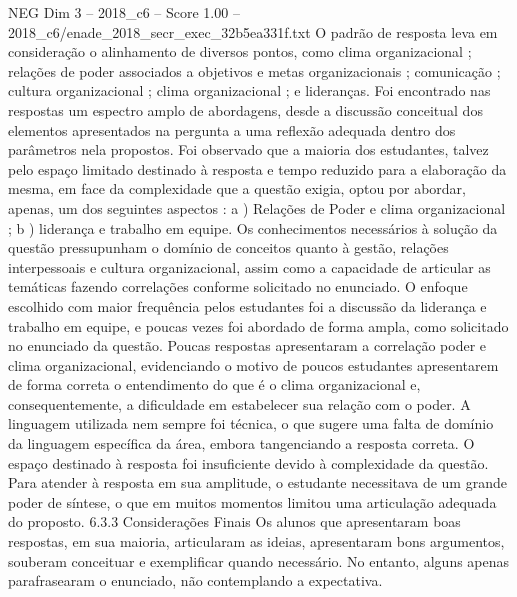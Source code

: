 \begin{textsample}{NEG Dim 3 – 2018\_c6 – Score 1.00 – 2018\_c6/enade\_2018\_secr\_exec\_32b5ea331f.txt}
O padrão de resposta leva em consideração o alinhamento de diversos pontos, como clima organizacional ; relações de poder associados a objetivos e metas organizacionais ; comunicação ; cultura organizacional ; clima organizacional ; e lideranças.
Foi encontrado nas respostas um espectro amplo de abordagens, desde a discussão conceitual dos elementos apresentados na pergunta a uma reflexão adequada dentro dos parâmetros nela propostos.
Foi observado que a maioria dos estudantes, talvez pelo espaço limitado destinado à resposta e tempo reduzido para a elaboração da mesma, em face da complexidade que a questão exigia, optou por abordar, apenas, um dos seguintes aspectos : a ) Relações de Poder e clima organizacional ; b ) liderança e trabalho em equipe.
Os conhecimentos necessários à solução da questão pressupunham o domínio de conceitos quanto à gestão, relações interpessoais e cultura organizacional, assim como a capacidade de articular as temáticas fazendo correlações conforme solicitado no enunciado.
O enfoque escolhido com maior frequência pelos estudantes foi a discussão da liderança e trabalho em equipe, e poucas vezes foi abordado de forma ampla, como solicitado no enunciado da questão.
Poucas respostas apresentaram a correlação poder e clima organizacional, evidenciando o motivo de poucos estudantes apresentarem de forma correta o entendimento do que é o clima organizacional e, consequentemente, a dificuldade em estabelecer sua relação com o poder.
A linguagem utilizada nem sempre foi técnica, o que sugere uma falta de domínio da linguagem específica da área, embora tangenciando a resposta correta.
O espaço destinado à resposta foi insuficiente devido à complexidade da questão.
Para atender à resposta em sua amplitude, o estudante necessitava de um grande poder de síntese, o que em muitos momentos limitou uma articulação adequada do proposto. 6.3.3 Considerações Finais Os alunos que apresentaram boas respostas, em sua maioria, articularam as ideias, apresentaram bons argumentos, souberam conceituar e exemplificar quando necessário.
No entanto, alguns apenas parafrasearam o enunciado, não contemplando a expectativa.

\end{textsample}
